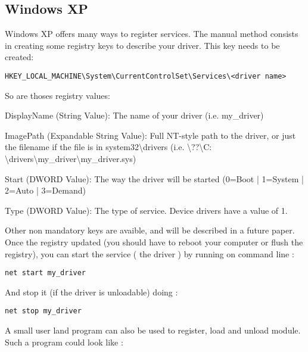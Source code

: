 \documentclass[11pt]{report}
\begin{document}
  \subsection{Windows XP}
Windows XP offers many ways to register services.
The manual method consists in creating some registry keys to describe
your driver.
This key needs to be created:
\begin{lstlisting}
HKEY_LOCAL_MACHINE\System\CurrentControlSet\Services\<driver name>
\end{lstlisting}
So are thoses registry values:
\begin{description}
\item{DisplayName (String Value): The name of your driver (i.e. my\_driver)}
\item{ImagePath (Expandable String Value): Full NT-style path to the driver, or just the
filename if the file is in system32\textbackslash drivers (i.e. \textbackslash ??\textbackslash C:
\textbackslash drivers\textbackslash my\_driver\textbackslash my\_driver.sys)}
\item{Start (DWORD Value): The way the driver will be started (0=Boot |
1=System | 2=Auto | 3=Demand)}
\item{Type (DWORD Value): The type of service. Device drivers have a value of 1.}
\end{description}
Other non mandatory keys are avaible, and will be described in a future paper.\\
Once the registry updated (you should have to reboot your computer or flush the registry),
you can start the service ( the driver ) by running on command line :
\begin{lstlisting}
net start my_driver
\end{lstlisting}
And stop it (if the driver is unloadable) doing :
\begin{lstlisting}
net stop my_driver
\end{lstlisting}
A small user land program can also be used to register, load and unload
module. Such a program could look like :
\end{document}
